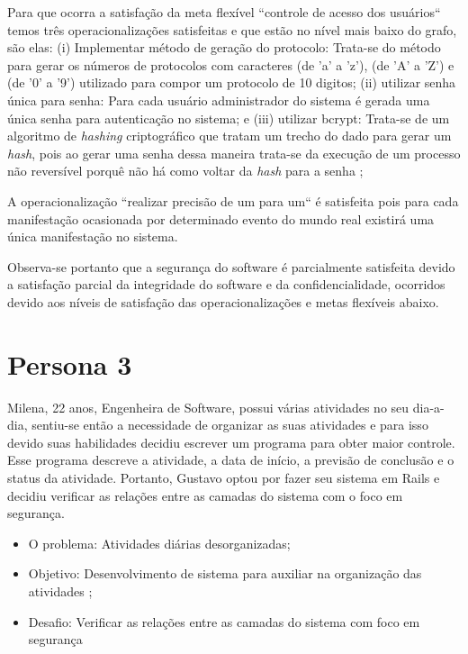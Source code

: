 Para que ocorra a satisfação da meta flexível ``controle de acesso dos usuários`` temos três operacionalizações satisfeitas e que estão no nível mais baixo do grafo, são elas: (i) Implementar método de geração do protocolo: Trata-se do método para gerar os números de protocolos com caracteres (de 'a' a 'z'), (de 'A' a 'Z') e (de '0' a '9') utilizado para compor um protocolo de 10 digitos; (ii) utilizar senha única para senha: Para cada usuário administrador do sistema é gerada uma única senha para autenticação no sistema; e (iii) utilizar bcrypt: Trata-se de um algoritmo de \textit{hashing} criptográfico que tratam um trecho do dado para gerar um \textit{hash}, pois ao gerar uma senha dessa maneira trata-se da execução de um processo não reversível porquê não há como voltar da \textit{hash} para a senha \cite{brcypt};

A operacionalização ``realizar precisão de um para um`` é satisfeita pois para cada manifestação ocasionada por determinado evento do mundo real existirá uma única manifestação no sistema.

Observa-se portanto que a segurança do software é parcialmente satisfeita devido a satisfação parcial da integridade do software e da confidencialidade, ocorridos devido aos níveis de satisfação das operacionalizações e metas flexíveis abaixo. 

\section{Persona 3}
\label{subsec:persona3}



Milena, 22 anos, Engenheira de Software, possui várias atividades no seu dia-a-dia, sentiu-se então a necessidade de organizar as suas atividades e para isso devido suas habilidades decidiu escrever um programa para obter maior controle. Esse programa descreve a atividade, a data de início, a previsão de conclusão e o status da atividade. Portanto, Gustavo optou por fazer seu sistema em Rails e decidiu verificar as relações entre as camadas do sistema com o foco em segurança.

\begin{itemize}
	\item O problema: Atividades diárias desorganizadas;
	\item Objetivo: Desenvolvimento de sistema para auxiliar na organização das atividades ;
	\item Desafio: Verificar as relações entre as camadas do sistema com foco em segurança
\end{itemize}

